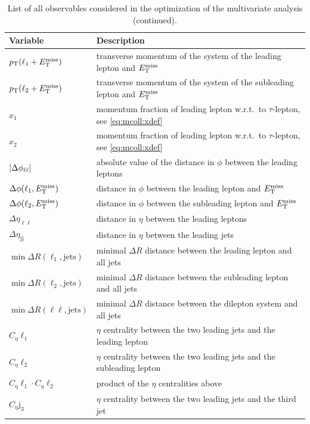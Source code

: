\begin{table}[htpb]
    \centering
    \caption{List of all observables considered in the optimization of the multivariate analysis (continued).}
    \begin{tabular}{ll}
        \toprule
        Variable & Description \\
        \midrule
        $p_\text{T} (\ell_1 + E_\text{T}^\text{miss})$ & transverse momentum of the system of the leading lepton and $E_\text{T}^\text{miss}$ \\
        $p_\text{T} (\ell_2 + E_\text{T}^\text{miss})$ & transverse momentum of the system of the subleading lepton and $E_\text{T}^\text{miss}$ \\
        $x_1$               & momentum fraction of leading lepton w.r.t.\ to $\tau$-lepton, see \cref{eq:mcoll:xdef} \\
        $x_2$               & momentum fraction of leading lepton w.r.t.\ to $\tau$-lepton, see \cref{eq:mcoll:xdef} \\
        $\left|\Delta \phi_{\ell\ell}\right|$ & absolute value of the distance in $\phi$ between the leading leptons \\
        $\Delta \phi (\ell_1, E_\text{T}^\text{miss})$& distance in $\phi$ between the leading lepton and $E_\text{T}^\text{miss}$ \\
        $\Delta \phi (\ell_2, E_\text{T}^\text{miss})$ & distance in $\phi$ between the subleading lepton and $E_\text{T}^\text{miss}$ \\
        $\Delta \eta_{\ell \ell}$ & distance in $\eta$ between the leading leptons \\
        $\Delta \eta_{\text{jj}}$ & distance in $\eta$ between the leading jets \\
        $\min \Delta R (\ell_1, \text{jets})$ & minimal $\Delta R$ distance between the leading lepton and all jets  \\
        $\min \Delta R (\ell_2, \text{jets})$ & minimal $\Delta R$ distance between the subleading lepton and all jets  \\
        $\min \Delta R (\ell\ell, \text{jets})$ & minimal $\Delta R$ distance between the dilepton system and all jets  \\
        $C_\eta{\ell_1}$ & $\eta$ centrality between the two leading jets and the leading lepton~\cite{SchilloPhd} \\
        $C_\eta{\ell_2}$ & $\eta$ centrality between the two leading jets and the subleading lepton \\
        $C_\eta{\ell_1} \cdot C_\eta{\ell_2}$ & product of the $\eta$ centralities above \\
        $C_\eta{\text{j}_3}$ & $\eta$ centrality between the two leading jets and the third jet\\

\end{tabular}
\end{table}
